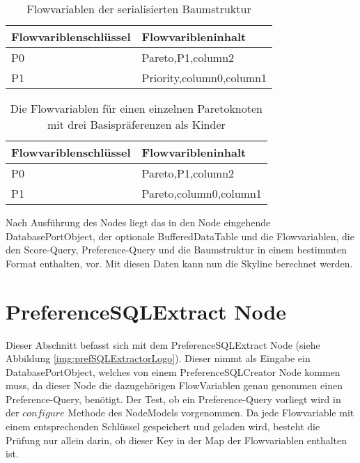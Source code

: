 \begin{table}[H]
  \centering
  \begin{tabular}{|M{4cm}|M{10cm}|}
    \hline 
    Flowvariblenschlüssel & Flowvaribleninhalt \\ \hline 
    P0 &  Pareto,P1,column2 \\ \hline
    P1 & Priority,column0,column1\\ \hline
  \end{tabular}
  \newline\newline
  \caption{Flowvariablen der serialisierten Baumstruktur}\label{tbl:serialization}
\end{table} 

\begin{table}[H]
  \centering
  \begin{tabular}{|M{4cm}|M{10cm}|}
    \hline   
    Flowvariblenschlüssel & Flowvaribleninhalt \\ \hline 
    P0 &  Pareto,P1,column2 \\ \hline
    P1 & Pareto,column0,column1\\ \hline
  \end{tabular}
  \newline\newline
  \caption{Die Flowvariablen für einen einzelnen Paretoknoten mit drei Basispräferenzen als Kinder}\label{tbl:threeChilds}
\end{table}

Nach Ausführung des Nodes liegt das in den Node eingehende DatabasePortObject, der optionale BufferedDataTable und die Flowvariablen, die den Score-Query, Preference-Query und die Baumstruktur in einem bestimmten Format enthalten, vor.
Mit diesen Daten kann nun die Skyline berechnet werden.
\section{PreferenceSQLExtract Node}
\label{ch:Implementierung:sec:prefSQLExtract}
Dieser Abschnitt befasst sich mit dem PreferenceSQLExtract Node (siehe Abbildung \ref{img:prefSQLExtractorLogo}). Dieser nimmt als Eingabe ein DatabasePortObject, welches von einem PreferenceSQLCreator Node kommen muss, da dieser Node die dazugehörigen FlowVariablen genau genommen einen Preference-Query, benötigt. 
Der Test, ob ein Preference-Query vorliegt wird in der $configure$ Methode des NodeModels vorgenommen. Da jede Flowvariable mit einem entsprechenden Schlüssel gespeichert und geladen wird, besteht die Prüfung nur allein darin, ob dieser Key in der Map der Flowvariablen enthalten ist.  

